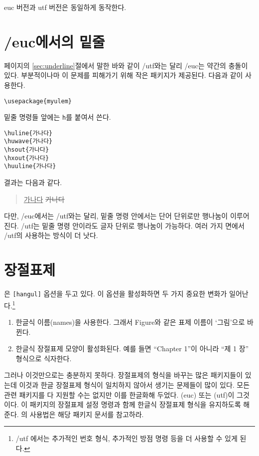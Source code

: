 euc 버전과 utf 버전은 동일하게 동작한다. 

\section{\kotex/euc에서의 밑줄}\label{sec:underlineulem}

\pageref{sec:underline} 페이지의 \ref{sec:underline}절에서
말한 바와 같이 \kotex/utf와는 달리 \kotex/euc는 \과
약간의 충돌이 있다. 부분적이나마 이 문제를 피해가기 위해  
작은 패키지가 제공된다. 다음과 같이 사용한다. 
\begin{verbatim}
\usepackage{myulem}
\end{verbatim}
밑줄 명령들 앞에는 \texttt{h}를 붙여서 쓴다.
\begin{verbatim}
\huline{가나다}
\huwave{가나다}
\hsout{가나다}
\hxout{가나다}
\huuline{가나다}
\end{verbatim}
결과는 다음과 같다.
\begin{quote}
\ifEUCmode
\else
 \uline{가나다}
 \sout{가나다}
\fi
\end{quote}
다만, \kotex/euc에서는 \kotex/utf와는 달리, 밑줄 명령 안에서는
단어 단위로만 행나눔이 이루어진다. \kotex/utf는 밑줄 명령 안이라도
글자 단위로 행나눔이 가능하다.
여러 가지 면에서 \kotex/utf의 \를 사용하는 방식이 더 낫다. 

\section{장절표제}\label{sec:sectsty}

\kotex 은 \texttt{[hangul]} 옵션을 두고 있다. 이 옵션을 활성화하면
두 가지 중요한 변화가 일어난다.\footnote{%
  \kotex/utf 에서는 추가적인 번호 형식, 추가적인 방점 명령 등을
  더 사용할 수 있게 된다.}
\begin{enumerate}
\item 한글식 이름(names)을 사용한다. 그래서 Figure와 같은 표제 이름이
`그림'으로 바뀐다.
\item 한글식 장절표제 모양이 활성화된다. 예를 들면 ``Chapter 1''이 아니라
``제 1 장'' 형식으로 식자한다.
\end{enumerate}

그러나 이것만으로는 충분하지 못하다. 장절표제의 형식을 바꾸는 많은
패키지들이 있는데 이것과 한글 장절표제 형식이 일치하지 않아서 생기는
문제들이 많이 있다. 모든 관련 패키지를 다 지원할 수는 없지만 
\은 이를 한글화해 두었다. (euc)
또는 (utf)이 그것이다. 이 패키지의
장절표제 설정 명령과 함께 한글식 장절표제 형식을 유지하도록 해준다.
의 사용법은 해당 패키지 문서를 참고하라. 

